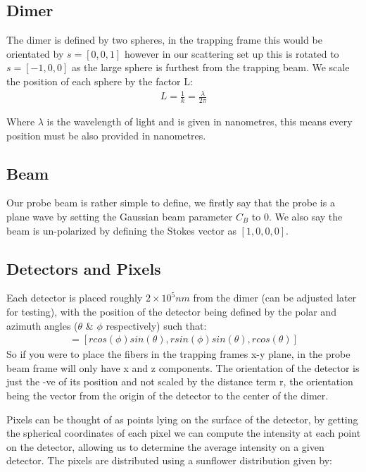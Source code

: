 \subsection{Dimer}
The dimer is defined by two spheres, in the trapping frame this would be orientated by $s=[0,0,1]$ however in our scattering set up this is rotated to $s=[-1,0,0]$ as the large sphere is furthest from the trapping beam. We scale the position of each sphere by the factor L:
\begin{align}
	L = \frac{1}{k} = \frac{\lambda}{2\pi}
\end{align}

Where $\lambda$ is the wavelength of light and is given in nanometres, this means every position must be also provided in nanometres.
\subsection{Beam}
Our probe beam is rather simple to define, we firstly say that the probe is a plane wave by setting the Gaussian beam parameter $C_B$ to 0. We also say the beam is un-polarized by defining the Stokes vector as $[1,0,0,0]$. 

\subsection{Detectors and Pixels}

Each detector is placed roughly $2\times 10^5 nm$ from the dimer (can be adjusted later for testing), with the position of the detector being defined by the polar and azimuth angles ($\theta$ \& $\phi$ respectively) such that:
\begin{align}
	[x_{fiber}, y_{fiber}, z_{fiber}] = [rcos(\phi)sin(\theta), rsin(\phi)sin(\theta), rcos(\theta)]
\end{align}
So if you were to place the fibers in the trapping frames x-y plane, in the probe beam frame will only have x and z components. The orientation of the detector is just the -ve of its position and not scaled by the distance term r, the orientation being the vector from the origin of the detector to the center of the dimer. 

Pixels can be thought of as points lying on the surface of the detector, by getting the spherical coordinates of each pixel we can compute the intensity at each point on the detector, allowing us to determine the average intensity on a given detector. The pixels are distributed using a sunflower distribution given by:

